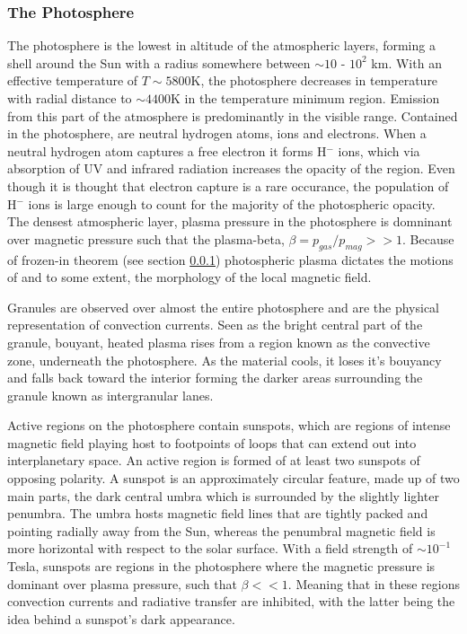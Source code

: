 \subsubsection{The Photosphere}
The photosphere is the lowest in altitude of the atmospheric layers, forming a shell around the Sun with a radius somewhere between $\sim10$ - $10^{2}$ km. With an effective temperature of $T\sim5800$K, the photosphere decreases in temperature with radial distance to $\sim4400$K in the temperature minimum region. Emission from this part of the atmosphere is predominantly in the visible range. Contained in the photosphere, are neutral hydrogen atoms, ions and electrons. When a neutral hydrogen atom captures a free electron it forms H$^{-}$ ions, which via absorption of UV and infrared radiation increases the opacity of the region. Even though it is thought that electron capture is a rare occurance, the population of H$^{-}$ ions is large enough to count for the majority of the photospheric opacity. The densest atmospheric layer, plasma pressure in the photosphere is domninant over magnetic pressure such that the plasma-beta, $\beta = p_{gas}/p_{mag} >> 1$. Because of frozen-in theorem (see section \ref{}) photospheric plasma dictates the motions of and to some extent, the morphology of the local magnetic field.

Granules are observed over almost the entire photosphere and are the physical representation of convection currents. Seen as the bright central part of the granule, bouyant, heated plasma rises from a region known as the convective zone, underneath the photosphere. As the material cools, it loses it's bouyancy and falls back toward the interior forming the darker areas surrounding the granule known as intergranular lanes.

Active regions on the photosphere contain sunspots, which are regions of intense magnetic field playing host to footpoints of loops that can extend out into interplanetary space. An active region is formed of at least two sunspots of opposing polarity. 
A sunspot is an approximately circular feature, made up of two main parts, the dark central umbra which is surrounded by the slightly lighter penumbra. The umbra hosts magnetic field lines that are tightly packed and pointing radially away from the Sun, whereas the penumbral magnetic field is more horizontal with respect to the solar surface. With a field strength of $\sim 10^{-1}$ Tesla, sunspots are regions in the photosphere where the magnetic pressure is dominant over plasma pressure, such that $\beta << 1$. Meaning that in these regions convection currents and radiative transfer are inhibited, with the latter being the idea behind a sunspot's dark appearance. \\


